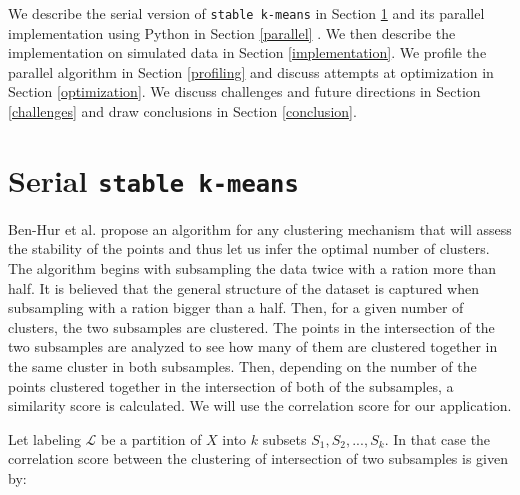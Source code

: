 \documentclass[10pt,twocolumn,letterpaper]{article}
\begin{document}
We describe the serial version of \texttt{stable k-means} in Section \ref{section:stable} and its parallel implementation using Python in Section \ref{parallel} . We then describe the implementation on simulated data in Section \ref{implementation}. We profile the parallel algorithm in Section \ref{profiling} and discuss attempts at optimization in Section \ref{optimization}. We discuss challenges and future directions in Section \ref{challenges} and draw conclusions in Section \ref{conclusion}.

\section{Serial \texttt{stable k-means}} \label{section:stable}


Ben-Hur et al. \cite{ben2001} propose an algorithm for any clustering mechanism that will assess the stability of the points and thus let us infer the optimal number of clusters. The algorithm begins with subsampling the data twice with a ration more than half. It is believed that the general structure of the dataset is captured when subsampling with a ration bigger than a half. Then, for a given number of clusters, the two subsamples are clustered. The points in the intersection of the two subsamples are analyzed to see how many of them are clustered together in the same cluster in both subsamples. Then, depending on the number of the points clustered together in the intersection of both of the subsamples, a similarity score is calculated. We will use the correlation score for our application.

Let labeling $\mathcal{L}$ be a partition of $X$ into $k$ subsets $S_1, S_2, ... , S_k$. In that case the correlation score between the clustering of intersection of two subsamples is given by: 
\end{document}
